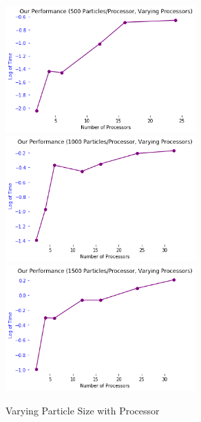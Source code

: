 \documentclass[12pt]{article}
\begin{document}
\begin{figure}[h]
  \caption{Varying Particle Size with Processor}
  \centering
    \includegraphics[width = 0.65\textwidth]{500_varying_particles_varying_processor.png}
  \includegraphics[width = 0.65\textwidth]{1000_varying_particles_varying_processor.png}
  \includegraphics[width = 0.65\textwidth]{1500_varying_particles_varying_processor.png}
 
\end{figure}

\clearpage
\end{document}

